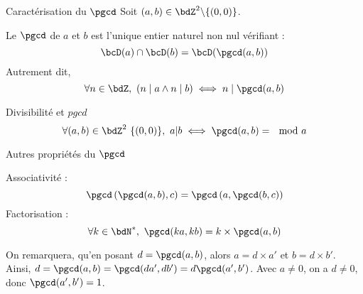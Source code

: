 \documentclass[a4paper,french,bookmarks]{article}
\begin{document}
\begin{theorem}{Caractérisation du $\pgcd$}{}
    Soit $(a, b) \in \bdZ^2 \backslash \{ (0, 0) \}$.
    
    Le $\pgcd$ de $a$ et $b$ est l'unique entier naturel non nul vérifiant :
    \[ \bcD(a) \cap \bcD(b) = \bcD(\pgcd(a, b))\]
    Autrement dit,
    \[\forall n \in \bdZ,\ (n \mid a \land n \mid b) \iff n \mid \pgcd(a,b)\]
\end{theorem}


\begin{property}{Divisibilité et $pgcd$}{}
    \[\forall (a, b) \in \bdZ^2 \ \{(0,0)\},\ a | b \iff \pgcd(a, b) = \mod{a}\]
\end{property}


\begin{property}{Autres propriétés du $\pgcd$}{}
\begin{enumerate}
    \itarr Associativité :
    \[ \pgcd\left(\pgcd(a, b), c\right) = \pgcd\left(a, \pgcd(b, c)\right)\]
    \itarr Factorisation :
    \[ \forall k \in \bdN^*,\ \pgcd(ka, kb) = k\times\pgcd(a, b)\]
\end{enumerate}
\end{property}


On remarquera, qu'en posant $d = \pgcd(a, b)$, alors $a = d \times a'$ et $b = d \times b'$. Ainsi, $d = \pgcd(a,b) = \pgcd(da', db') = d\pgcd(a',b')$.
Avec $a \neq 0$, on a $d \neq 0$, donc $\pgcd(a', b') = 1$.
\end{document}
